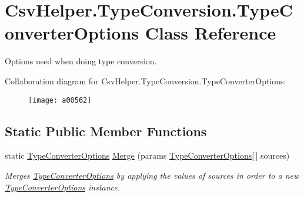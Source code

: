\hypertarget{a00172}{\section{Csv\-Helper.\-Type\-Conversion.\-Type\-Converter\-Options Class Reference}
\label{a00172}
}


Options used when doing type conversion.  




Collaboration diagram for Csv\-Helper.\-Type\-Conversion.\-Type\-Converter\-Options\-:
\nopagebreak
\begin{figure}[H]
\begin{center}
\leavevmode
\texttt{[image: a00562]}
\end{center}
\end{figure}
\subsection*{Static Public Member Functions}
\begin{DoxyCompactItemize}
\item 
static \hyperlink{a00172}{Type\-Converter\-Options} \hyperlink{a00172_a0532694cffc600fe984e10c7f1375e0a}{Merge} (params \hyperlink{a00172}{Type\-Converter\-Options}\mbox{[}$\,$\mbox{]} sources)
\begin{DoxyCompactList}\small\item\em Merges \hyperlink{a00172}{Type\-Converter\-Options} by applying the values of sources in order to a new \hyperlink{a00172}{Type\-Converter\-Options} instance. \end{DoxyCompactList}\end{DoxyCompactItemize}

